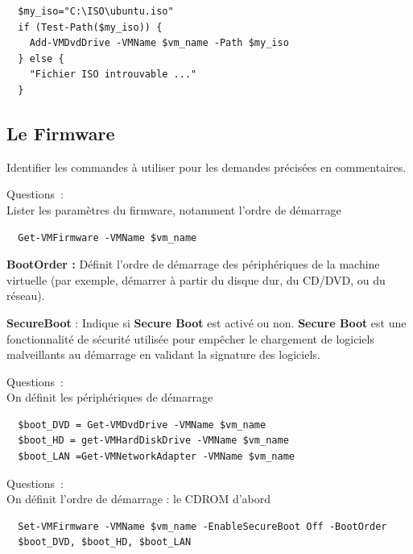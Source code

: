 \begin{verbatim}
  $my_iso="C:\ISO\ubuntu.iso"
  if (Test-Path($my_iso)) {
    Add-VMDvdDrive -VMName $vm_name -Path $my_iso
  } else {
    "Fichier ISO introuvable ..."
  }
\end{verbatim}

\subsection*{Le Firmware}
{}
\noindent Identifier les commandes à utiliser pour les demandes précisées en commentaires.

\vspace{0.5cm}

Questions~: \\
Lister les paramètres du firmware, notamment l'ordre de démarrage

\begin{verbatim}
  Get-VMFirmware -VMName $vm_name
\end{verbatim}

\noindent \textbf{BootOrder :} Définit l'ordre de démarrage des périphériques de la machine virtuelle (par exemple, démarrer à partir du disque dur, du CD/DVD, ou du réseau).

\noindent \textbf{SecureBoot} : Indique si \textbf{Secure Boot} est activé ou non. \textbf{Secure Boot} est une fonctionnalité de sécurité utilisée pour empêcher le chargement de logiciels malveillants au démarrage en validant la signature des logiciels.

\vspace{0.5cm}

Questions~: \\
On définit les périphériques de démarrage

\begin{verbatim}
  $boot_DVD = Get-VMDvdDrive -VMName $vm_name
  $boot_HD = get-VMHardDiskDrive -VMName $vm_name
  $boot_LAN =Get-VMNetworkAdapter -VMName $vm_name
\end{verbatim}

\vspace{0.5cm}

Questions~: \\
On définit l'ordre de démarrage : le CDROM d'abord

\begin{verbatim}
  Set-VMFirmware -VMName $vm_name -EnableSecureBoot Off -BootOrder
  $boot_DVD, $boot_HD, $boot_LAN
\end{verbatim}

